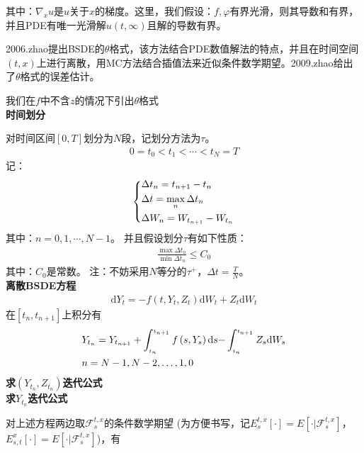 			其中：${\nabla_x}u$是$u$关于$x$的梯度。这里，我们假设：$f,\varphi$有界光滑，则其导数和有界，并且PDE有唯一光滑解$u(t,\infty)$且解的导数有界。
			\par
			2006.zhao\cite{2006.zhao}提出BSDE的$\theta$格式，该方法结合PDE数值解法的特点，并且在时间空间$(t,x)$上进行离散，用MC方法结合插值法来近似条件数学期望。2009.zhao\cite{2009.zhao}给出了$\theta$格式的误差估计。
			\par
			我们在$f$中不含$z$的情况下引出$\theta$格式\\
			\textbf{时间划分}
			\par
			对时间区间$[0,T]$划分为$N$段，记划分方法为$\tau$。
			\begin{align*}
			0=t_0<t_1<\cdots<t_N=T\end{align*}
			记：
					\begin{equation*}
					\centering
					\left\{\begin{lgathered}
					{\Delta {t_n} = {t_{n + 1}} - {t_n}}\\
					{\Delta t = \mathop {\max }\limits_n \Delta {t_n}}\\
					{\Delta {W_n} = W_{t_{n + 1}} - W_{t_n}}
					\end{lgathered} \right.
					\end{equation*}
			其中：$n=0,1,\cdots,N-1$。
			并且假设划分$\tau$有如下性质：
			\begin{align*}
			\frac{{\max \Delta {t_n}}}{{\min \Delta {t_n}}} \leqslant {C_0}\end{align*}
			其中：$C_0$是常数。
			注：不妨采用$N$等分的$\tau^{+}$，$\Delta t = \frac{T}{N}$。\\
			\textbf{离散BSDE方程}
			\begin{align*}
			\mathrm{d}{Y_t} =  - f\left( {t,{Y_t},{Z_t}} \right)\mathrm{d}{W_t} + {Z_t}\mathrm{d}{W_t}\end{align*}
			在$[t_n,t_{n+1}]$上积分有
			\begin{align}\label{eq:离散BSDE的积分}
			&{Y_{{t_n}}} = {Y_{{t_{n + 1}}}} + \int_{_{{t_n}}}^{_{{t_{n + 1}}}} {f\left( {s,{Y_s}} \right)\mathrm{d}s - } \int_{_{{t_n}}}^{_{{t_{n + 1}}}} {{Z_s}\mathrm{d}{W_s}} \\
			&n=N-1,N-2,\ldots,1,0 \notag
			\end{align}
			\textbf{求$(Y_{t_n},Z_{t_n})$迭代公式}\\
			\checkmark \textbf{求$Y_{t_n}$迭代公式}
			\par
			对上述方程两边取${{\mathcal{F}}_s^{t,x}}$的条件数学期望
			(为方便书写，记$E_s^{t,x}[\cdot]=E[\cdot|{\mathcal{F}_s^{t,x}}]$，$E_{s,t}^{x}[\cdot]=E[\cdot|{\mathcal{F}_s^{t,x}}]$)，有
